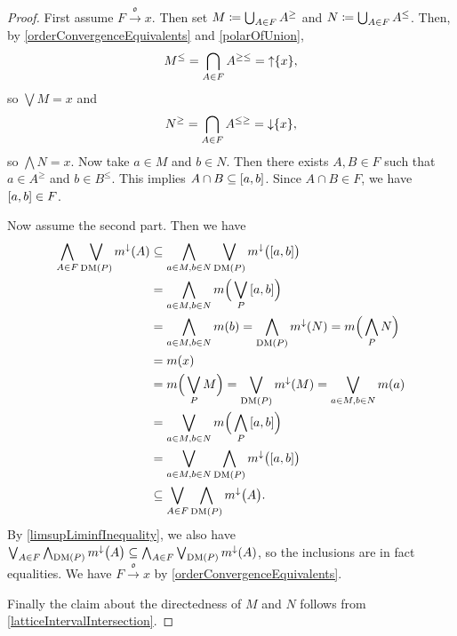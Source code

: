 \begin{proof}
First assume $F\overset{\mathfrak{o}}{\longrightarrow} x$. Then set $M \coloneqq \bigcup_{A\in F}A^\geq$ and $N \coloneqq \bigcup_{A\in F}A^\leq$. Then, by \ref{orderConvergenceEquivalents} and \ref{polarOfUnion},
\[ M^\leq = \bigcap_{A\in F}A^{\geq\leq} = \operatorname{\uparrow}\{x\}, \]
so $\bigvee M = x$ and
\[ N^\geq = \bigcap_{A\in F}A^{\leq\geq} = \operatorname{\downarrow}\{x\}, \]
so $\bigwedge N = x$. Now take $a\in M$ and $b\in N$. Then there exists $A,B\in F$ such that $a\in A^\geq$ and $b\in B^\leq$. This implies $A\cap B \subseteq \interval{a,b}$. Since $A\cap B\in F$, we have $\interval{a,b}\in F$.

Now assume the second part. Then we have
\begin{align*}
\bigwedge_{A\in F}\bigvee_{\DM(P)} m^\imf(A) &\subseteq \bigwedge_{a\in M, b\in N}\bigvee_{\DM(P)} m^\imf\big(\interval{a,b}\big) \\
&= \bigwedge_{a\in M, b\in N} m\Big(\bigvee_{P}\interval{a,b}\Big) \\
&= \bigwedge_{a\in M, b\in N} m(b) = \bigwedge_{\DM(P)} m^\imf(N) = m\Big(\bigwedge_P N\Big) \\
&= m(x) \\
&= m\Big(\bigvee_P M\Big) = \bigvee_{\DM(P)} m^\imf(M) = \bigvee_{a\in M, b\in N} m(a) \\
&= \bigvee_{a\in M, b\in N} m\Big(\bigwedge_{P}\interval{a,b}\Big) \\
&= \bigvee_{a\in M, b\in N}\bigwedge_{\DM(P)} m^\imf\big(\interval{a,b}\big) \\
&\subseteq \bigvee_{A\in F}\bigwedge_{\DM(P)} m^\imf\big(A\big).
\end{align*}
By \ref{limsupLiminfInequality}, we also have $\bigvee_{A\in F}\bigwedge_{\operatorname{DM}(P)} m^\downarrow\big(A\big) \subseteq \bigwedge_{A\in F}\bigvee_{\operatorname{DM}(P)} m^\downarrow(A)$, so the inclusions are in fact equalities. We have $F\overset{\mathfrak{o}}{\longrightarrow} x$ by \ref{orderConvergenceEquivalents}.

Finally the claim about the directedness of $M$ and $N$ follows from \ref{latticeIntervalIntersection}.
\end{proof}

